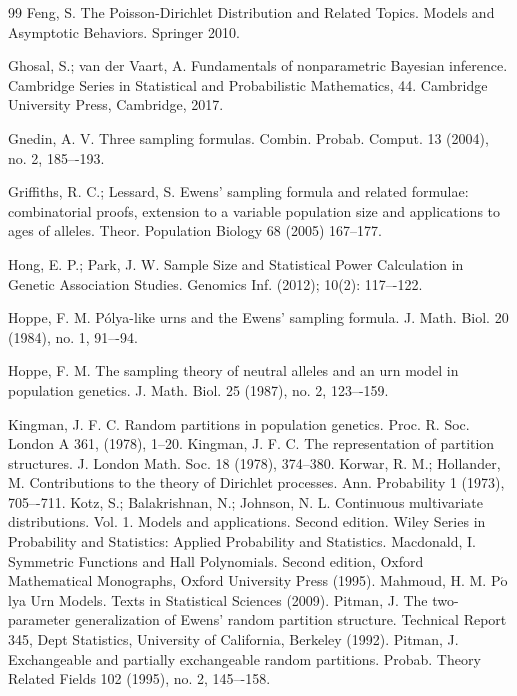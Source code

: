 \documentclass[12pt]{amsart}
\theoremstyle{definition}
\numberwithin{equation}{section}
\begin{document}
\begin{thebibliography}{99}
Feng, S. The Poisson-Dirichlet Distribution and Related Topics. Models and Asymptotic  Behaviors.
Springer 2010.

 Ghosal, S.; van der Vaart, A. Fundamentals of nonparametric Bayesian inference. Cambridge Series in Statistical and Probabilistic Mathematics, 44. Cambridge University Press, Cambridge, 2017.

 Gnedin, A. V. Three sampling formulas. Combin. Probab. Comput. 13 (2004), no. 2, 185–-193.

Griffiths, R. C.; Lessard, S. Ewens' sampling formula and related formulae: combinatorial proofs, extension to a variable population size and applications to ages of alleles. Theor. Population Biology
68 (2005) 167--177.

 Hong, E. P.; Park, J. W.
Sample Size and Statistical Power Calculation in Genetic Association Studies.
Genomics Inf. (2012); 10(2): 117–-122.

Hoppe, F. M. Pólya-like urns and the Ewens' sampling formula. J. Math. Biol. 20 (1984), no. 1, 91–-94.

 Hoppe, F. M. The sampling theory of neutral alleles and an urn model in population genetics. J. Math. Biol. 25 (1987), no. 2, 123–-159.









 Kingman, J. F. C. Random partitions in population genetics. Proc. R. Soc. London A 361, (1978), 1--20.
Kingman, J. F. C. The representation of partition structures. J. London Math. Soc. 18 (1978), 374--380.
  Korwar, R. M.; Hollander, M. Contributions to the theory of Dirichlet processes. Ann. Probability 1 (1973), 705–-711.
 Kotz, S.; Balakrishnan, N.; Johnson, N. L. Continuous multivariate distributions. Vol. 1. Models and applications. Second edition. Wiley Series in Probability and Statistics: Applied Probability and Statistics.
 Macdonald, I. Symmetric Functions and Hall Polynomials. Second edition,
Oxford Mathematical Monographs, Oxford University Press (1995).
 Mahmoud, H. M. P$\acute{\mbox{o}}$lya Urn Models. Texts in Statistical Sciences (2009).
 Pitman, J. The two-parameter generalization of Ewens' random partition structure.
Technical Report 345, Dept Statistics, University of California, Berkeley (1992).
 Pitman, J. Exchangeable and partially exchangeable random partitions. Probab. Theory Related Fields 102 (1995), no. 2, 145–-158.


\end{thebibliography}
\end{document}
